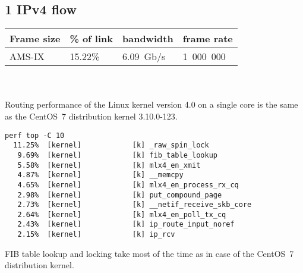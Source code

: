 
\subsection{1 IPv4 flow}
\begin{tabular}{ | l | l | l | l | }
\hline
Frame size & \% of link & bandwidth & frame rate \\
\hline
AMS-IX & 15.22\% &  6.09~Gb/s & 1~000~000 \\
\hline
\end{tabular}
\\
\\
Routing performance of the Linux kernel version 4.0 on a single core is the same as the CentOS~7 distribution kernel 3.10.0-123.


\begin{lstlisting}
perf top -C 10
  11.25%  [kernel]            [k] _raw_spin_lock
   9.69%  [kernel]            [k] fib_table_lookup
   5.58%  [kernel]            [k] mlx4_en_xmit
   4.87%  [kernel]            [k] __memcpy
   4.65%  [kernel]            [k] mlx4_en_process_rx_cq
   2.98%  [kernel]            [k] put_compound_page
   2.73%  [kernel]            [k] __netif_receive_skb_core
   2.64%  [kernel]            [k] mlx4_en_poll_tx_cq
   2.43%  [kernel]            [k] ip_route_input_noref
   2.15%  [kernel]            [k] ip_rcv

\end{lstlisting}
FIB table lookup and locking take most of the time as in case of the CentOS~7 distribution kernel.
